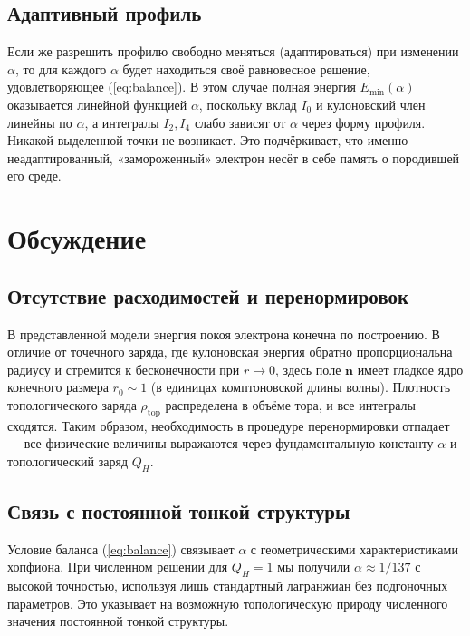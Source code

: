 \documentclass[12pt]{article}
\begin{document}
\subsection{Адаптивный профиль}
Если же разрешить профилю свободно меняться (адаптироваться) при изменении $\alpha$, то для каждого $\alpha$ будет находиться своё равновесное решение, удовлетворяющее (\ref{eq:balance}). В этом случае полная энергия $E_{\min}(\alpha)$ оказывается линейной функцией $\alpha$, поскольку вклад $I_0$ и кулоновский член линейны по $\alpha$, а интегралы $I_2, I_4$ слабо зависят от $\alpha$ через форму профиля. Никакой выделенной точки не возникает. Это подчёркивает, что именно неадаптированный, «замороженный» электрон несёт в себе память о породившей его среде.

\section{Обсуждение}
\label{sec:discussion}

\subsection{Отсутствие расходимостей и перенормировок}
В представленной модели энергия покоя электрона конечна по построению. В отличие от точечного заряда, где кулоновская энергия обратно пропорциональна радиусу и стремится к бесконечности при $r\to0$, здесь поле $\mathbf{n}$ имеет гладкое ядро конечного размера $r_0 \sim 1$ (в единицах комптоновской длины волны). Плотность топологического заряда $\rho_{\text{top}}$ распределена в объёме тора, и все интегралы сходятся. Таким образом, необходимость в процедуре перенормировки отпадает --- все физические величины выражаются через фундаментальную константу $\alpha$ и топологический заряд $Q_H$.

\subsection{Связь с постоянной тонкой структуры}
Условие баланса (\ref{eq:balance}) связывает $\alpha$ с геометрическими характеристиками хопфиона. При численном решении для $Q_H=1$ мы получили $\alpha \approx 1/137$ с высокой точностью, используя лишь стандартный лагранжиан без подгоночных параметров. Это указывает на возможную топологическую природу численного значения постоянной тонкой структуры.
\end{document}
